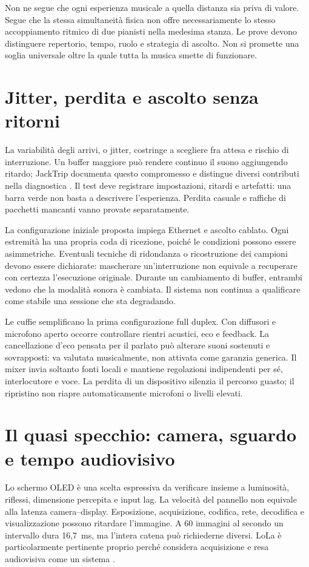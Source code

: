 Non ne segue che ogni esperienza musicale a quella distanza sia
priva di valore. Segue che la stessa simultaneità fisica non offre
necessariamente lo stesso accoppiamento ritmico di due pianisti
nella medesima stanza. Le prove devono distinguere repertorio,
tempo, ruolo e strategia di ascolto. Non si promette una soglia
universale oltre la quale tutta la musica smette di funzionare.

\section{Jitter, perdita e ascolto senza ritorni}

La variabilità degli arrivi, o jitter, costringe a scegliere fra
attesa e rischio di interruzione. Un buffer maggiore può rendere
continuo il suono aggiungendo ritardo; JackTrip documenta questo
compromesso e distingue diversi contributi nella diagnostica
\cite{net_jacktrip_latency}. Il test deve registrare impostazioni,
ritardi e artefatti: una barra verde non basta a descrivere
l'esperienza. Perdita casuale e raffiche di pacchetti mancanti
vanno provate separatamente.

La configurazione iniziale proposta impiega Ethernet e ascolto
cablato. Ogni estremità ha una propria coda di ricezione, poiché
le condizioni possono essere asimmetriche. Eventuali tecniche di
ridondanza o ricostruzione dei campioni devono essere dichiarate:
mascherare un'interruzione non equivale a recuperare con certezza
l'esecuzione originale. Durante un cambiamento di buffer, entrambi
vedono che la modalità sonora è cambiata. Il sistema non continua
a qualificare come stabile una sessione che sta degradando.

Le cuffie semplificano la prima configurazione full duplex. Con
diffusori e microfono aperto occorre controllare rientri acustici,
eco e feedback. La cancellazione d'eco pensata per il parlato
può alterare suoni sostenuti e sovrapposti: va valutata musicalmente,
non attivata come garanzia generica. Il mixer invia soltanto fonti
locali e mantiene regolazioni indipendenti per sé, interlocutore
e voce. La perdita di un dispositivo silenzia il percorso guasto;
il ripristino non riapre automaticamente microfoni o livelli elevati.

\section{Il quasi specchio: camera, sguardo e tempo audiovisivo}

Lo schermo OLED è una scelta espressiva da verificare insieme a
luminosità, riflessi, dimensione percepita e input lag. La velocità
del pannello non equivale alla latenza camera--display. Esposizione,
acquisizione, codifica, rete, decodifica e visualizzazione possono
ritardare l'immagine. A 60 immagini al secondo un intervallo dura
16,7~ms, ma l'intera catena può richiederne diversi. LoLa è
particolarmente pertinente proprio perché considera acquisizione
e resa audiovisiva come un sistema \cite{net_lola_manual}.

